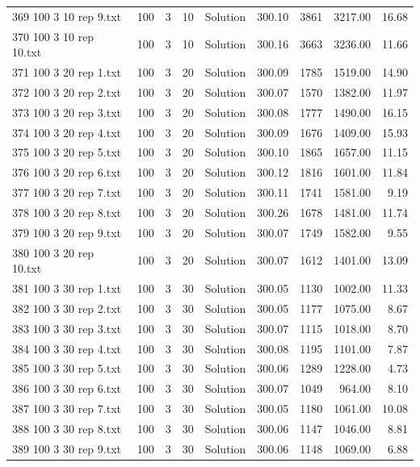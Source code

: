 \begin{longtable}{lrrllrrrr}
369 100 3 10 rep 9.txt & 100 & 3 & 10 & Solution & 300.10 & 3861 & 3217.00 & 16.68\\
370 100 3 10 rep 10.txt & 100 & 3 & 10 & Solution & 300.16 & 3663 & 3236.00 & 11.66\\
371 100 3 20 rep 1.txt & 100 & 3 & 20 & Solution & 300.09 & 1785 & 1519.00 & 14.90\\
372 100 3 20 rep 2.txt & 100 & 3 & 20 & Solution & 300.07 & 1570 & 1382.00 & 11.97\\
373 100 3 20 rep 3.txt & 100 & 3 & 20 & Solution & 300.08 & 1777 & 1490.00 & 16.15\\
374 100 3 20 rep 4.txt & 100 & 3 & 20 & Solution & 300.09 & 1676 & 1409.00 & 15.93\\
375 100 3 20 rep 5.txt & 100 & 3 & 20 & Solution & 300.10 & 1865 & 1657.00 & 11.15\\
376 100 3 20 rep 6.txt & 100 & 3 & 20 & Solution & 300.12 & 1816 & 1601.00 & 11.84\\
377 100 3 20 rep 7.txt & 100 & 3 & 20 & Solution & 300.11 & 1741 & 1581.00 &  9.19\\
378 100 3 20 rep 8.txt & 100 & 3 & 20 & Solution & 300.26 & 1678 & 1481.00 & 11.74\\
379 100 3 20 rep 9.txt & 100 & 3 & 20 & Solution & 300.07 & 1749 & 1582.00 &  9.55\\
380 100 3 20 rep 10.txt & 100 & 3 & 20 & Solution & 300.07 & 1612 & 1401.00 & 13.09\\
381 100 3 30 rep 1.txt & 100 & 3 & 30 & Solution & 300.05 & 1130 & 1002.00 & 11.33\\
382 100 3 30 rep 2.txt & 100 & 3 & 30 & Solution & 300.05 & 1177 & 1075.00 &  8.67\\
383 100 3 30 rep 3.txt & 100 & 3 & 30 & Solution & 300.07 & 1115 & 1018.00 &  8.70\\
384 100 3 30 rep 4.txt & 100 & 3 & 30 & Solution & 300.08 & 1195 & 1101.00 &  7.87\\
385 100 3 30 rep 5.txt & 100 & 3 & 30 & Solution & 300.06 & 1289 & 1228.00 &  4.73\\
386 100 3 30 rep 6.txt & 100 & 3 & 30 & Solution & 300.07 & 1049 & 964.00 &  8.10\\
387 100 3 30 rep 7.txt & 100 & 3 & 30 & Solution & 300.05 & 1180 & 1061.00 & 10.08\\
388 100 3 30 rep 8.txt & 100 & 3 & 30 & Solution & 300.06 & 1147 & 1046.00 &  8.81\\
389 100 3 30 rep 9.txt & 100 & 3 & 30 & Solution & 300.06 & 1148 & 1069.00 &  6.88\\

\end{longtable}
